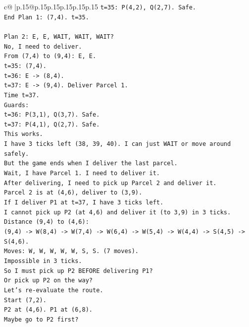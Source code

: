 \documentclass{article}
\begin{document}
{\begin{supertabular}{c@{$\;$}|p{.15\linewidth}@{}p{.15\linewidth}p{.15\linewidth}p{.15\linewidth}p{.15\linewidth}p{.15\linewidth}}
{{{\texttt{t=35: P(4,2), Q(2,7). Safe.} \\
\texttt{End Plan 1: (7,4). t=35.} \\
\\ 
\texttt{Plan 2: E, E, WAIT, WAIT, WAIT?} \\
\texttt{No, I need to deliver.} \\
\texttt{From (7,4) to (9,4): E, E.} \\
\texttt{t=35: (7,4).} \\
\texttt{t=36: E {-}> (8,4).} \\
\texttt{t=37: E {-}> (9,4). Deliver Parcel 1.} \\
\texttt{Time t=37.} \\
\texttt{Guards:} \\
\texttt{t=36: P(3,1), Q(3,7). Safe.} \\
\texttt{t=37: P(4,1), Q(2,7). Safe.} \\
\texttt{This works.} \\
\texttt{I have 3 ticks left (38, 39, 40). I can just WAIT or move around safely.} \\
\texttt{But the game ends when I deliver the last parcel.} \\
\texttt{Wait, I have Parcel 1. I need to deliver it.} \\
\texttt{After delivering, I need to pick up Parcel 2 and deliver it.} \\
\texttt{Parcel 2 is at (4,6), deliver to (3,9).} \\
\texttt{If I deliver P1 at t=37, I have 3 ticks left.} \\
\texttt{I cannot pick up P2 (at 4,6) and deliver it (to 3,9) in 3 ticks.} \\
\texttt{Distance (9,4) to (4,6):} \\
\texttt{(9,4) {-}> W(8,4) {-}> W(7,4) {-}> W(6,4) {-}> W(5,4) {-}> W(4,4) {-}> S(4,5) {-}> S(4,6).} \\
\texttt{Moves: W, W, W, W, W, S, S. (7 moves).} \\
\texttt{Impossible in 3 ticks.} \\
\texttt{So I must pick up P2 BEFORE delivering P1?} \\
\texttt{Or pick up P2 on the way?} \\
\texttt{Let's re{-}evaluate the route.} \\
\texttt{Start (7,2).} \\
\texttt{P2 at (4,6). P1 at (6,8).} \\
\texttt{Maybe go to P2 first?} \\
}}}
\end{supertabular}}
\end{document}
